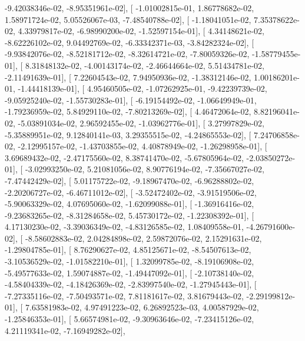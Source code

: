 \documentclass{article}
\begin{document}
         -9.42038346e-02,  -8.95351961e-02],
       [ -1.01002815e-01,   1.86778682e-02,   1.58971724e-02,
          5.05526067e-03,  -7.48540788e-02],
       [ -1.18041051e-02,   7.35378622e-02,   4.33979817e-02,
         -6.98990200e-02,  -1.52597154e-01],
       [  4.34148621e-02,  -8.62226102e-02,   9.04492769e-02,
         -6.33342371e-03,  -3.84282324e-02],
       [ -9.93842076e-02,  -8.52181712e-02,  -8.32614721e-02,
         -7.80059326e-02,  -1.58779455e-01],
       [  8.31848132e-02,  -4.00143174e-02,  -2.46644664e-02,
          5.51434781e-02,  -2.11491639e-01],
       [  7.22604543e-02,   7.94950936e-02,  -1.38312146e-02,
          1.00186201e-01,  -1.44418139e-01],
       [  4.95460505e-02,  -1.07262925e-01,  -9.42239739e-02,
         -9.05925240e-02,  -1.55730283e-01],
       [ -6.19154492e-02,  -1.06649949e-01,  -1.79236959e-02,
          5.84929110e-02,  -7.80213269e-02],
       [  4.46472064e-02,   8.82196041e-02,  -5.03891034e-02,
          2.96592455e-02,  -1.03962776e-01],
       [  3.27997829e-02,  -5.35889951e-02,   9.12840141e-03,
          3.29355515e-02,  -4.24865553e-02],
       [  7.24706858e-02,  -2.12995157e-02,  -1.43703855e-02,
          4.40878949e-02,  -1.26298958e-01],
       [  3.69689432e-02,  -2.47175560e-02,   8.38741470e-02,
         -5.67805964e-02,  -2.03850272e-01],
       [ -3.02993250e-02,   5.21081056e-02,   8.90776194e-02,
         -7.35667027e-02,  -7.47442429e-02],
       [  5.01175722e-02,  -9.18967470e-02,  -6.96288802e-02,
         -2.20206727e-02,  -6.46711012e-02],
       [ -3.52472402e-02,  -3.91519506e-02,  -5.90063329e-02,
          4.07695060e-02,  -1.62099088e-01],
       [ -1.36916416e-02,  -9.23683265e-02,  -8.31284658e-02,
          5.45730172e-02,  -1.22308392e-01],
       [  4.17130230e-02,  -3.39036349e-02,  -4.83126585e-02,
          1.08409558e-01,  -4.26791600e-02],
       [ -8.58602883e-02,   2.04284898e-02,   2.59872076e-02,
          2.15291631e-02,  -1.29804785e-01],
       [  8.76290627e-02,   4.85125671e-02,  -8.54507613e-02,
         -3.10536529e-02,  -1.01582210e-01],
       [  1.32099785e-02,  -8.19106908e-02,  -5.49577633e-02,
          1.59074887e-02,  -1.49447092e-01],
       [ -2.10738140e-02,  -4.58404339e-02,  -4.18426369e-02,
         -2.83997540e-02,  -1.27945443e-01],
       [ -7.27335116e-02,  -7.50493571e-02,   7.81181617e-02,
          3.81679443e-02,  -2.29199812e-01],
       [  7.63581983e-02,   4.97491223e-02,   6.26892523e-03,
          4.00587929e-02,  -1.25846353e-01],
       [  5.66574981e-02,  -9.30963646e-02,  -7.23415126e-02,
          4.21119341e-02,  -7.16949282e-02],
\end{document}
